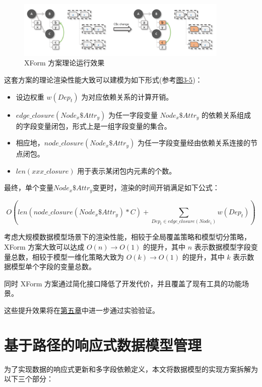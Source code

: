 \documentclass[winfonts,master,twoside]{njuthesis}
\begin{document}
\begin{figure}[h]
    \centering
    \includegraphics[width=0.9\textwidth]{figure/chapter-2/accurate.png}
    \caption{XForm 方案理论运行效果}
    \label{accurate}
\end{figure}

这套方案的理论渲染性能大致可以建模为如下形式(参考\hyperref[accurate]{图3-5})：

\begin{itemize}
    \item 设边权重 $w(Dep_t)$ 为对应依赖关系的计算开销。
    \item $edge\_closure(Node_x\$Attr_y)$ 为任一字段变量 $Node_x\$Attr_y$ 的依赖关系组成的字段变量闭包，形式上是一组字段变量的集合。
    \item 相应地，$node\_closure(Node_x\$Attr_y)$ 为任一字段变量经由依赖关系连接的节点闭包。
    \item $len(xxx\_closure)$ 用于表示某闭包内元素的个数。
\end{itemize}

最终，单个变量$Node_x\$Attr_y$变更时，渲染的时间开销满足如下公式：

\begin{equation}
O(len(node\_closure(Node_x\$Attr_y)*C)+\sum_{Dep_t\in edge\_closure(Node_i)}w(Dep_t))
\end{equation}

考虑大规模数据模型场景下的渲染性能，相较于全局覆盖策略和模型切分策略，XForm 方案大致可以达成 $O(n)\rightarrow O(1)$ 的提升，其中 $n$ 表示数据模型字段变量总数，相较于模型一维化策略大致为 $O(k)\rightarrow O(1)$ 的提升，其中 $k$ 表示数据模型单个字段的变量总数。

同时 XForm 方案通过简化接口降低了开发代价，并且覆盖了现有工具的功能场景。

这些提升效果将在\hyperref[experiment-examine]{第五章}中进一步通过实验验证。

\chapter{基于路径的响应式数据模型管理}\label{reactive-datamodel-based-on-path-system}

为了实现数据的响应式更新和多字段依赖定义，本文将数据模型的实现方案拆解为以下三个部分：
\end{document}
